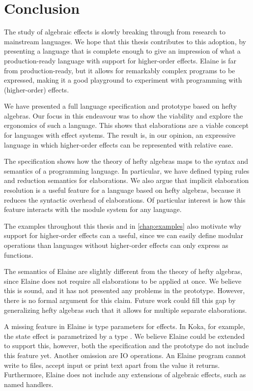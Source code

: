 \chapter{Conclusion}

The study of algebraic effects is slowly breaking through from research to mainstream languages. We hope that this thesis contributes to this adoption, by presenting a language that is complete enough to give an impression of what a production-ready language with support for higher-order effects. Elaine is far from production-ready, but it allows for remarkably complex programs to be expressed, making it a good playground to experiment with programming with (higher-order) effects.

We have presented a full language specification and prototype based on hefty algebras. Our focus in this endeavour was to show the viability and explore the ergonomics of such a language. This shows that elaborations are a viable concept for languages with effect systems. The result is, in our opinion, an expressive language in which higher-order effects can be represented with relative ease.

The specification shows how the theory of hefty algebras maps to the syntax and semantics of a programming language. In particular, we have defined typing rules and reduction semantics for elaborations. We also argue that implicit elaboration resolution is a useful feature for a language based on hefty algebras, because it reduces the syntactic overhead of elaborations. Of particular interest is how this feature interacts with the module system for any language.

The examples throughout this thesis and in \cref{chap:examples} also motivate why support for higher-order effects can a useful, since we can easily define modular operations than languages without higher-order effects can only express as functions.

The semantics of Elaine are slightly different from the theory of hefty algebras, since Elaine does not require all elaborations to be applied at once. We believe this is sound, and it has not presented any problems in the prototype. However, there is no formal argument for this claim. Future work could fill this gap by generalizing hefty algebras such that it allows for multiple separate elaborations.

A missing feature in Elaine is type parameters for effects. In Koka, for example, the state effect  is parametrized by a type . We believe Elaine could be extended to support this, however, both the specification and the prototype do not include this feature yet. Another omission are IO operations. An Elaine program cannot write to files, accept input or print text apart from the value it returns. Furthermore, Elaine does not include any extensions of algebraic effects, such as named handlers.

